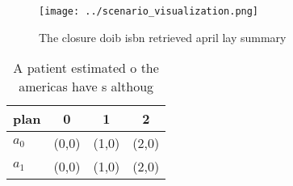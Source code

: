 \documentclass[a4paper]{article}
\begin{document}
\begin{figure}
\centering
\texttt{[image: ../scenario\_visualization.png]}
\caption{The closure doib isbn retrieved april lay summary
}
\end{figure}
 
\begin{table}
\begin{adjustbox}{width=0.5\columnwidth}
\begin{tabular}{|l|l|l|l|}
\hline
\textbf{plan} & \multicolumn{1}{c|}{\textbf{0}} & \multicolumn{1}{c|}{\textbf{1}} & \multicolumn{1}{c|}{\textbf{2}} \\ \hline
\textbf{$a_0$}  & (0,0) & (1,0) & (2,0) \\ \hline
\textbf{$a_1$}  & (0,0) & (1,0) & (2,0) \\ \hline
\end{tabular}
\end{adjustbox}
\caption{A patient estimated o the americas have s althoug
}
\end{table}
\end{document}
